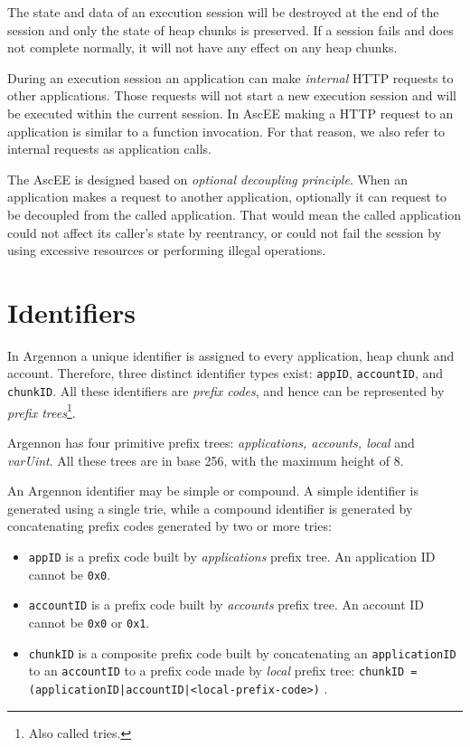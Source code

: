 The state and data of an execution session will be
destroyed at the end of the session and only the state of heap chunks is preserved. If a session fails and does not
complete normally, it will not have any effect on any heap chunks.

During an execution session an application can make \emph{internal} HTTP requests to other applications. Those
requests will not start a new execution session and will be executed within the current session. In AscEE making a
HTTP request to an application is similar to a function invocation. For that reason, we also refer to internal requests
as application calls.

The AscEE is designed based on \emph{optional decoupling principle}. When an application makes a request to another
application, optionally it can request to be decoupled from the called application. That would mean the called
application could not affect its caller's state by reentrancy, or could not fail the session by using excessive
resources or performing illegal operations.


\section{Identifiers}\label{sec:identifiers}

In Argennon a unique identifier is assigned to every application, heap chunk and account. Therefore, three distinct
identifier types exist: \texttt{appID}, \texttt{accountID}, and \texttt{chunkID}.
All these identifiers are \emph{prefix codes}, and hence can be represented by
\emph{prefix trees}\footnote{Also called tries.}.

Argennon has four primitive prefix trees:
\emph{applications, accounts, local} and \emph{varUint}.
All these trees are in base 256, with the maximum height
of 8.

An Argennon identifier may be simple or compound. A simple identifier is generated using a single trie, while a
compound identifier is generated by concatenating prefix codes generated by two or more tries:

\begin{itemize}
    \item \texttt{appID} is a prefix code built by \emph{applications} prefix tree. An application ID cannot
    be \texttt{0x0}.

    \item \texttt{accountID} is a prefix code built by \emph{accounts} prefix tree. An account ID cannot
    be \texttt{0x0} or \texttt{0x1}.

    \item \texttt{chunkID} is a composite prefix code built by concatenating an \texttt{applicationID} to
    an \texttt{accountID} to a prefix code made by \emph{local} prefix tree:
    \subitem \texttt{chunkID = (applicationID|accountID|<local-prefix-code>)} .
\end{itemize}

